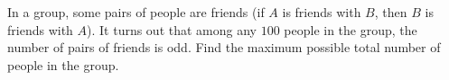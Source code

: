 In a group, some pairs of people are friends (if $A$ is friends with $B$, then $B$ is friends with $A$). It turns out that among any $100$ people in the group, the number of pairs of friends is odd. Find the maximum possible total number of people in the group.
